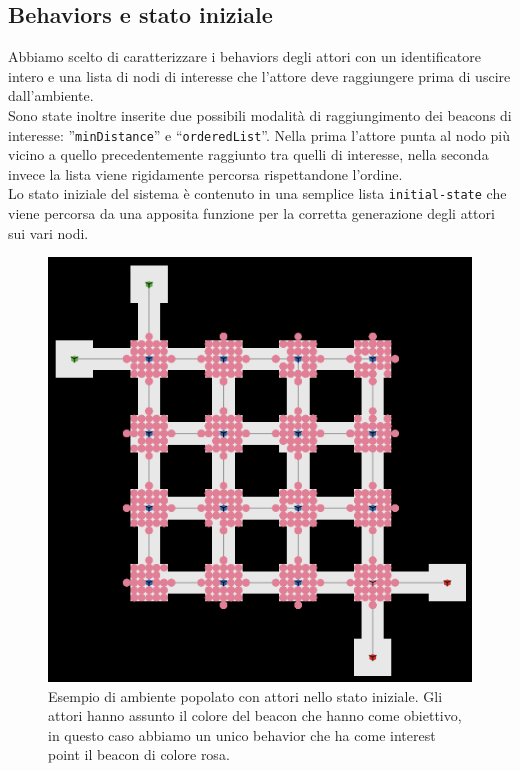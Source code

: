 \subsection{Behaviors e stato iniziale}
Abbiamo scelto di caratterizzare i behaviors degli attori con un identificatore intero e una lista di nodi di interesse che l'attore deve raggiungere prima di uscire dall'ambiente.\\
Sono state inoltre inserite due possibili modalità di raggiungimento dei beacons di interesse: ”\texttt{minDistance}” e “\texttt{orderedList}”. Nella prima l'attore punta al nodo più vicino a quello precedentemente raggiunto tra quelli di interesse, nella seconda invece la lista viene rigidamente percorsa rispettandone l'ordine.\\
Lo stato iniziale del sistema è contenuto in una semplice lista \texttt{initial-state} che viene percorsa da una apposita funzione per la corretta generazione degli attori sui vari nodi. 
\begin{figure}[htbp]
\centering
\includegraphics[width=\textwidth,height=\textheight,keepaspectratio]{images/movers-screen.png}
\caption{Esempio di ambiente popolato con attori nello stato iniziale. Gli attori hanno assunto il colore del beacon che hanno come obiettivo, in questo caso abbiamo un unico behavior che ha come interest point il beacon di colore rosa.}
\label{fig:movers-screen}
\end{figure}


